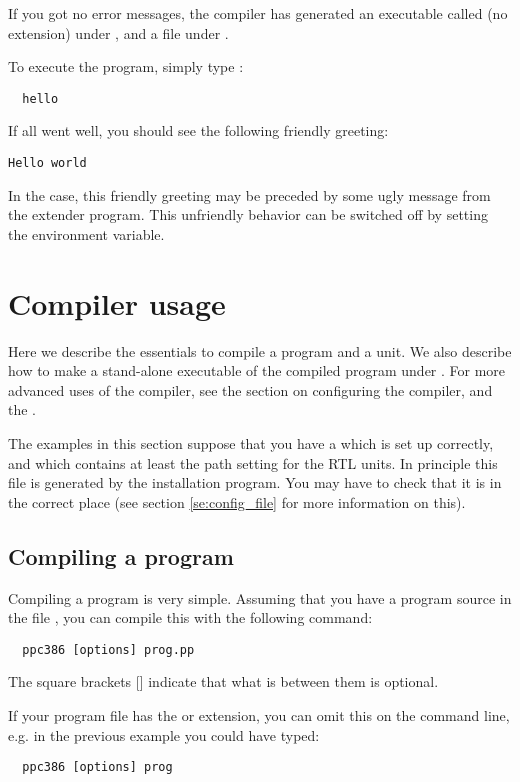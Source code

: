 \documentclass{report}
\begin{document}
If you got no error messages, the compiler has generated an executable 
called   (no extension) under \linux, and a file 
under \dos. 

To execute the program, simply type :
\begin{verbatim}
  hello
\end{verbatim}
If all went well, you should see the following friendly greeting:
\begin{verbatim}
Hello world
\end{verbatim}
In the \dos case, this friendly greeting may be preceded by some ugly
message from the  extender program. This unfriendly behavior can 
be switched off by setting the  environment variable.

\chapter{Compiler usage}
Here we describe the essentials to compile a program and a unit. 
We also describe how to make a stand-alone executable of the 
compiled program under \dos. For more advanced uses of the compiler, 
see the section on configuring the compiler, and the 
\progref.

The examples in this section suppose that you have a  which
is set up correctly, and which contains at least the path setting for the
RTL units. In principle this file is generated by the installation program.
You may have to check that it is in the correct place (see section
\ref{se:config_file} for more information on this).


\section{Compiling a program}
Compiling a program is very simple. Assuming that you have a program source
in the file , you can compile this with the following command:
\begin{verbatim}
  ppc386 [options] prog.pp
\end{verbatim}
The square brackets [] indicate that what is between them is optional. 

If your program file has the  or  extension, 
you can omit this on the command line, e.g. in the previous example you 
could have typed:
\begin{verbatim}
  ppc386 [options] prog
\end{verbatim}
\end{document}
